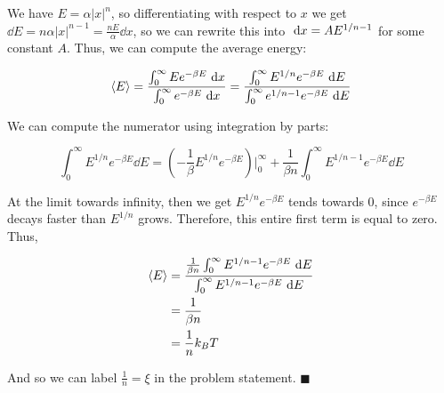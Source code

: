 \documentclass[10pt]{article}
\begin{document}
\begin{solution}
    We have $E = \alpha |x|^n$, so differentiating with respect to $x$ we get $\dd E = n\alpha |x|^{n - 1} = \frac{nE}{\alpha} \dd x$, so we can rewrite this into $\ \mathrm d x = AE^{1/n - 1}$ for some constant $A$. Thus, we can compute the average energy:

    \[ \langle E \rangle = \frac{\int_0^\infty Ee^{-\beta E} \ \mathrm d x}{\int_0^\infty e^{-\beta E} \ \mathrm d x} = \frac{\int_0^\infty E^{1/n} e^{-\beta E} \ \mathrm d E}{\int_0^\infty e^{1/n - 1} e^{-\beta E} \ \mathrm d E}\]

    We can compute the numerator using integration by parts: 

    \[ \int_0^\infty E^{1/n} e^{-\beta E} \dd E = (-\frac{1}{\beta} E^{1/n} e^{-\beta E})\bigg|_0^\infty + \frac{1}{\beta n} \int_0^\infty E^{1/n - 1} e^{-\beta E} \dd E\] 

    At the limit towards infinity, then we get $E^{1/n} e^{-\beta E}$ tends towards 0, since $e^{-\beta E}$ decays faster than $E^{1/n}$ grows. Therefore, this entire first term is equal to zero. Thus, 

    \begin{align*}
        \langle E \rangle &= \frac{\frac{1}{\beta n} \int_0^\infty E^{1/n - 1} e^{-\beta E} \ \mathrm d E}{\int_0^\infty E^{1/n - 1} e^{-\beta E} \ \mathrm d E}\\
        &= \frac{1}{\beta n}\\
        &= \frac{1}{n} k_BT
    \end{align*}

    And so we can label $\frac{1}{n} = \xi$ in the problem statement. $\blacksquare$
\end{solution}
\end{document}
